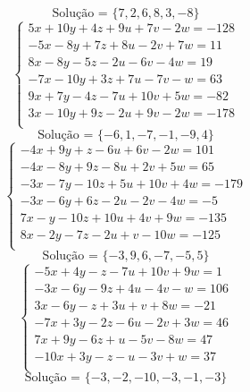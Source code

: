 \documentclass[12pt,oneside,a4paper]{article}
\begin{document}
\begin{equation*}
\text{Solução = }\{7,2,6,8,3,-8\}
\end{equation*}
\vspace{\baselineskip}
\begin{equation*}
\begin{cases}
5x+10y+4z+9u+7v-2w=-128 \\
-5x-8y+7z+8u-2v+7w=11 \\
8x-8y-5z-2u-6v-4w=19 \\
-7x-10y+3z+7u-7v-w=63 \\
9x+7y-4z-7u+10v+5w=-82 \\
3x-10y+9z-2u+9v-2w=-178 \\
\end{cases}
\end{equation*}
\begin{equation*}
\text{Solução = }\{-6,1,-7,-1,-9,4\}
\end{equation*}
\vspace{\baselineskip}
\begin{equation*}
\begin{cases}
-4x+9y+z-6u+6v-2w=101 \\
-4x-8y+9z-8u+2v+5w=65 \\
-3x-7y-10z+5u+10v+4w=-179 \\
-3x-6y+6z-2u-2v-4w=-5 \\
7x-y-10z+10u+4v+9w=-135 \\
8x-2y-7z-2u+v-10w=-125 \\
\end{cases}
\end{equation*}
\begin{equation*}
\text{Solução = }\{-3,9,6,-7,-5,5\}
\end{equation*}
\vspace{\baselineskip}
\begin{equation*}
\begin{cases}
-5x+4y-z-7u+10v+9w=1 \\
-3x-6y-9z+4u-4v-w=106 \\
3x-6y-z+3u+v+8w=-21 \\
-7x+3y-2z-6u-2v+3w=46 \\
7x+9y-6z+u-5v-8w=47 \\
-10x+3y-z-u-3v+w=37 \\
\end{cases}
\end{equation*}
\begin{equation*}
\text{Solução = }\{-3,-2,-10,-3,-1,-3\}
\end{equation*}
\end{document}
